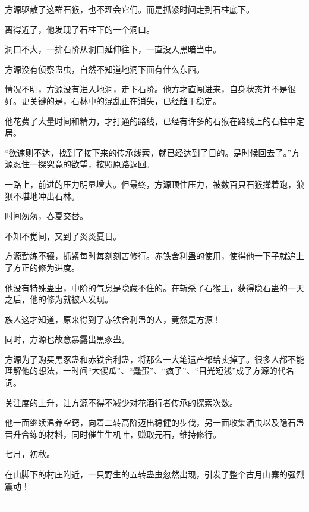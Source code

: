 \begin{this_body}
方源驱散了这群石猴，也不理会它们。而是抓紧时间走到石柱底下。

离得近了，他发现了石柱下的一个洞口。

洞口不大，一排石阶从洞口延伸往下，一直没入黑暗当中。

方源没有侦察蛊虫，自然不知道地洞下面有什么东西。

情况不明，方源没有进入地洞，走下石阶。他方才直闯进来，自身状态并不是很好。更关键的是，石林中的混乱正在消失，已经趋于稳定。

他花费了大量时间和精力，才打通的路线，已经有许多的石猴在路线上的石柱中定居。

“欲速则不达，找到了接下来的传承线索，就已经达到了目的。是时候回去了。”方源忍住一探究竟的欲望，按照原路返回。

一路上，前进的压力明显增大。但最终，方源顶住压力，被数百只石猴撵着跑，狼狈不堪地冲出石林。

时间匆匆，春夏交替。

不知不觉间，又到了炎炎夏日。

方源勤练不辍，抓紧每时每刻刻苦修行。赤铁舍利蛊的使用，使得他一下子就追上了方正的修为进度。

他没有特殊蛊虫，中阶的气息是隐藏不住的。在斩杀了石猴王，获得隐石蛊的一天之后，他的修为就被人发现。

族人这才知道，原来得到了赤铁舍利蛊的人，竟然是方源！

同时，方源也故意暴露出黒豕蛊。

方源为了购买黒豕蛊和赤铁舍利蛊，将那么一大笔遗产都给卖掉了。很多人都不能理解他的想法，一时间“大傻瓜”、“蠢蛋”、“疯子”、“目光短浅”成了方源的代名词。

关注度的上升，让方源不得不减少对花酒行者传承的探索次数。

他一面继续温养空窍，向着二转高阶迈出稳健的步伐，另一面收集酒虫以及隐石蛊晋升合练的材料，同时催生生机叶，赚取元石，维持修行。

七月，初秋。

在山脚下的村庄附近，一只野生的五转蛊虫忽然出现，引发了整个古月山寨的强烈震动！

------------

\end{this_body}

